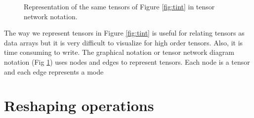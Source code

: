 \documentclass[11pt,a4paper,openright,oneside]{book}
\numberwithin{equation}{section}
\begin{document}
\begin{figure}
\centering
{}\qquad {}\qquad {}
\caption{
    Representation of the same tensors of Figure \ref{fig:tint} in tensor network notation.
}
\label{fig:tnot}
\end{figure}

The way we represent tensors in Figure \ref{fig:tint} is useful for
relating tensors as data arrays but it is very difficult to visualize for high order tensors. Also, it is time consuming
to write. The graphical notation or tensor network diagram notation (Fig \ref{fig:tnot}) uses nodes and edges to represent tensors. Each node is
a tensor and each edge represents a mode

\section{Reshaping operations}
\end{document}
